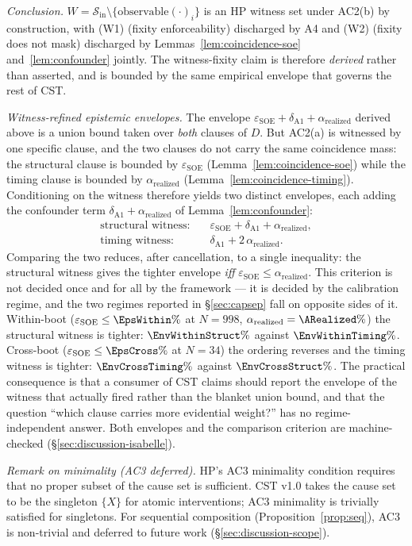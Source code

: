 \documentclass[conference]{IEEEtran}
\newcommand{\arealized}{\alpha_\text{realized}}
\newcommand{\epsSOE}{\varepsilon_\text{SOE}}
\begin{document}
\emph{Conclusion.}
$W = \mathcal{S}_\text{in} \setminus \{\text{observable}(\cdot)_i\}$
is an HP witness set under AC2(b) by construction, with (W1)
(fixity enforceability) discharged by A4 and (W2)
(fixity does not mask) discharged by
Lemmas~\ref{lem:coincidence-soe} and~\ref{lem:confounder}
jointly. The witness-fixity claim is therefore \emph{derived}
rather than asserted, and is bounded by the same empirical
envelope that governs the rest of CST.

\emph{Witness-refined epistemic envelopes.} The envelope
$\epsSOE + \delta_{\text{A1}} + \arealized$ derived above is a
union bound taken over \emph{both} clauses of $D$. But AC2(a) is
witnessed by one specific clause, and the two clauses do not carry
the same coincidence mass: the structural clause is bounded by
$\epsSOE$ (Lemma~\ref{lem:coincidence-soe}) while the timing clause
is bounded by $\arealized$ (Lemma~\ref{lem:coincidence-timing}).
Conditioning on the witness therefore yields two distinct
envelopes, each adding the confounder term
$\delta_{\text{A1}} + \arealized$ of Lemma~\ref{lem:confounder}:
\begin{align*}
\text{structural witness:}\quad & \epsSOE + \delta_{\text{A1}} + \arealized,\\
\text{timing witness:}\quad     & \delta_{\text{A1}} + 2\,\arealized.
\end{align*}
Comparing the two reduces, after cancellation, to a single
inequality: the structural witness gives the tighter envelope
\emph{iff} $\epsSOE \leq \arealized$. This criterion is not
decided once and for all by the framework --- it is decided by the
calibration regime, and the two regimes reported in
\S\ref{sec:capsep} fall on opposite sides of it. Within-boot
($\epsSOE \leq \EpsWithin\%$ at $N{=}998$, $\arealized = \ARealized\%$) the
structural witness is tighter: $\EnvWithinStruct\%$ against $\EnvWithinTiming\%$.
Cross-boot ($\epsSOE \leq \EpsCross\%$ at $N{=}34$) the ordering
reverses and the timing witness is tighter: $\EnvCrossTiming\%$ against
$\EnvCrossStruct\%$. The practical consequence is that a consumer of CST
claims should report the envelope of the witness that actually
fired rather than the blanket union bound, and that the question
``which clause carries more evidential weight?'' has no
regime-independent answer. Both envelopes and the comparison
criterion are machine-checked
(\S\ref{sec:discussion-isabelle}).

\emph{Remark on minimality (AC3 deferred).} HP's AC3 minimality
condition requires that no proper subset of the cause set is
sufficient. CST v1.0 takes the cause set to be the singleton
$\{X\}$ for atomic interventions; AC3 minimality is trivially
satisfied for singletons. For sequential composition
(Proposition~\ref{prop:seq}), AC3 is non-trivial and deferred to future work
(\S\ref{sec:discussion-scope}).
\end{document}
